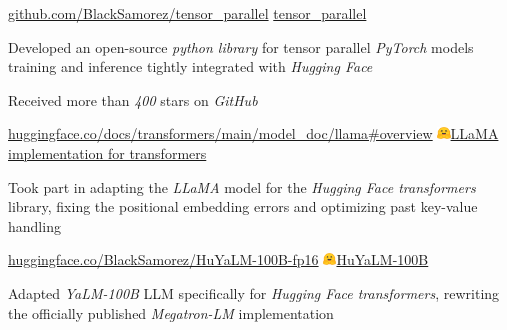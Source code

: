 
\begin{cventries}
  \cventry
    {\href{https://github.com/BlackSamorez/tensor_parallel}{\url{github.com/BlackSamorez/tensor_parallel}}} %
    {\faGithub\acvHeaderIconSep\href{https://github.com/BlackSamorez/tensor_parallel}{tensor\_parallel}} %
    {} %
    {} %
    {
      \begin{cvitems} %
        \item { Developed an open-source \textit{python library} for tensor parallel \textit{PyTorch} models training and inference tightly integrated with \textit{Hugging Face} }
        \item { Received more than \textit{400} stars on \textit{GitHub} }
      \end{cvitems}
    }

  \cventry
    {\href{https://huggingface.co/docs/transformers/main/model_doc/llama\#overview}{\url{huggingface.co/docs/transformers/main/model_doc/llama\#overview}}} %
    {\includegraphics[width=3.5mm]{hf.jpg}\acvHeaderIconSep\href{https://huggingface.co/docs/transformers/main/model_doc/llama}{LLaMA implementation for transformers}} %
    {} %
    {} %
    {
      \begin{cvitems} %
        \item {Took part in adapting the \textit{LLaMA} model for the \textit{Hugging Face transformers} library, fixing the positional embedding errors and optimizing past key-value handling}
      \end{cvitems}
    }

  \cventry
    {\href{https://huggingface.co/BlackSamorez/HuYaLM-100B-fp16}{\url{huggingface.co/BlackSamorez/HuYaLM-100B-fp16}}} %
    {\includegraphics[width=3.5mm]{hf.jpg}\acvHeaderIconSep\href{https://huggingface.co/BlackSamorez/HuYaLM-100B-fp16}{HuYaLM-100B}} %
    {} %
    {} %
    {
      \begin{cvitems} %
        \item { Adapted \textit{YaLM-100B} LLM specifically for \textit{Hugging Face transformers}, rewriting the officially published \textit{Megatron-LM} implementation }
      \end{cvitems}
    }
    

\end{cventries}
